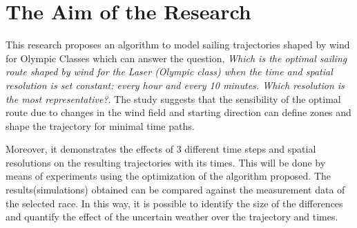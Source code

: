  \section{The Aim of the Research}
This research proposes an algorithm to model sailing trajectories shaped by wind for Olympic Classes which %
can answer the question, \textit{Which is the optimal sailing route shaped by wind for the Laser (Olympic class) when the time and spatial resolution is set constant: every hour and every 10 minutes. Which resolution is the most representative?}. The study suggests that the sensibility of the optimal route due to changes in the wind field and starting direction can define zones and shape the trajectory for minimal time paths. \par 

Moreover, it demonstrates the effects of 3 different time steps and spatial resolutions on the resulting trajectories with its times. This will be done by means of experiments using the optimization of the algorithm proposed. The results(simulations) obtained can be compared against the measurement data of the selected race. In this way, it is possible to identify the size of the differences and quantify the effect of the uncertain weather over the trajectory and times.\par 

